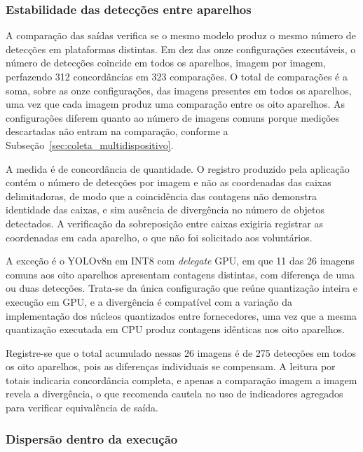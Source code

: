 \documentclass[artigo,times,capa]{iftex2024}
\begin{document}
\subsubsection{Estabilidade das detecções entre aparelhos}
\label{sec:estabilidade_deteccoes}

A comparação das saídas verifica se o mesmo modelo produz o mesmo número
de detecções em plataformas distintas. Em dez das onze configurações
executáveis, o número de detecções coincide em todos os aparelhos, imagem por
imagem, perfazendo 312 concordâncias em 323 comparações. O total de
comparações é a soma, sobre as onze configurações, das imagens presentes em
todos os aparelhos, uma vez que cada imagem produz uma comparação entre os
oito aparelhos. As configurações diferem quanto ao número de imagens comuns
porque medições descartadas não entram na comparação, conforme a
Subseção~\ref{sec:coleta_multidispositivo}.

A medida é de concordância de quantidade. O registro produzido pela aplicação
contém o número de detecções por imagem e não as coordenadas das caixas
delimitadoras, de modo que a coincidência das contagens não demonstra
identidade das caixas, e sim ausência de divergência no número de objetos
detectados. A verificação da sobreposição entre caixas exigiria registrar as
coordenadas em cada aparelho, o que não foi solicitado aos voluntários.

A exceção é o YOLOv8n em \ac{INT8} com \textit{delegate} \ac{GPU}, em que 11
das 26 imagens comuns aos oito aparelhos apresentam contagens distintas, com
diferença de uma ou duas detecções. Trata-se da única configuração que reúne
quantização inteira e execução em \ac{GPU}, e a divergência é compatível com a
variação da implementação dos núcleos quantizados entre fornecedores, uma vez
que a mesma quantização executada em \ac{CPU} produz contagens
idênticas nos oito aparelhos.

Registre-se que o total acumulado nessas 26 imagens é de 275 detecções em todos os oito aparelhos, pois as diferenças individuais se compensam. A
leitura por totais indicaria concordância completa, e apenas a comparação
imagem a imagem revela a divergência, o que recomenda cautela no uso de
indicadores agregados para verificar equivalência de saída.

\subsubsection{Dispersão dentro da execução}
\label{sec:dispersao_multidispositivo}
\end{document}

